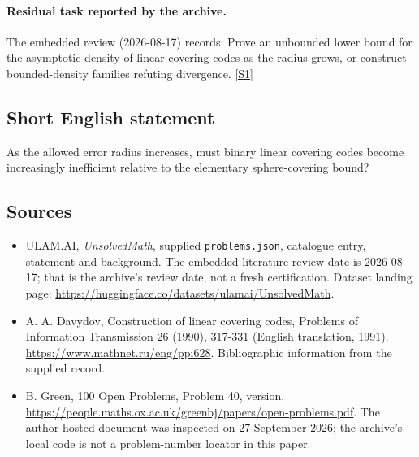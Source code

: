 \documentclass[11pt,a4paper]{article}
\newcommand{\sref}[2]{\hyperlink{source:#1:#2}{[S#2]}}
\begin{document}
\paragraph{Residual task reported by the archive.}

The embedded review (2026-08-17) records: Prove an unbounded lower bound for the asymptotic density of linear covering codes as the radius grows, or construct bounded-density families refuting divergence. \sref{statement}{1}

\subsection{Short English statement}

As the allowed error radius increases, must binary linear covering codes become increasingly inefficient relative to the elementary sphere-covering bound?

\subsection{Sources}

{\small

\begin{itemize}

\item[\hypertarget{source:statement:1}{S1}] ULAM.AI, \emph{UnsolvedMath}, supplied \texttt{problems.json}, catalogue entry, statement and background. The embedded literature-review date is 2026-08-17; that is the archive’s review date, not a fresh certification. Dataset landing page: \url{https://huggingface.co/datasets/ulamai/UnsolvedMath}.

\item[\hypertarget{source:statement:2}{S2}] A. A. Davydov, Construction of linear covering codes, Problems of Information Transmission 26 (1990), 317-331 (English translation, 1991). \url{https://www.mathnet.ru/eng/ppi628}. Bibliographic information from the supplied record.

\item[\hypertarget{source:statement:3}{S3}] B. Green, 100 Open Problems, Problem 40, version. \url{https://people.maths.ox.ac.uk/greenbj/papers/open-problems.pdf}. The author-hosted document was inspected on 27 September 2026; the archive’s local code is not a problem-number locator in this paper.

\end{itemize}

}

\label{end:statement}
\end{document}
